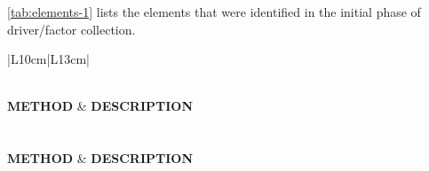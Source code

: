 \label{appendix:elements-1}

\autoref{tab:elements-1} lists the elements that were identified in the initial phase of driver/factor collection.

\begin{landscape}
  \centering
  \small
  \begin{longtable}{|L{10cm}|L{13cm}|}
    \caption{Drivers and factors identified in the initial collection phase}\label{tab:elements-1}\\
    \hline
    \color{white}\textbf{METHOD} & \color{white}\textbf{DESCRIPTION} \\
    \hline
    \endfirsthead%
    \hline
     \\
    \endfoot%
     \\
    \hline
    \color{white}\textbf{METHOD} & \color{white}\textbf{DESCRIPTION} \\
    \hline
    \endhead%
    \bottomrule
    \endlastfoot%
  \end{longtable}
\end{landscape}